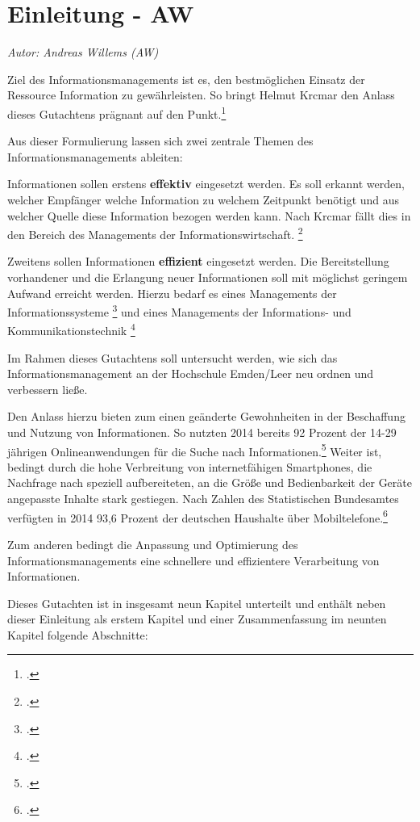 \chapter{Einleitung - AW}
\textit{Autor: Andreas Willems (AW)}

\glqq Ziel des Informationsmanagements ist es, den bestmöglichen Einsatz der 
Ressource Information zu gewährleisten.\grqq{} So bringt Helmut Krcmar den 
Anlass dieses Gutachtens prägnant auf den Punkt.\footcite[11]{krcmar_einfuhrung_2015}

Aus dieser Formulierung lassen sich zwei zentrale Themen des Informationsmanagements ableiten:

Informationen sollen erstens \textbf{effektiv} eingesetzt werden. Es soll erkannt werden, 
welcher Empfänger welche Information zu welchem Zeitpunkt benötigt und aus welcher 
Quelle diese Information bezogen werden kann. Nach Krcmar fällt dies in den Bereich des
\glqq Managements der Informationswirtschaft\grqq{}.
\footcite[Vgl.][13 ff.]{krcmar_einfuhrung_2015}

Zweitens sollen Informationen \textbf{effizient} eingesetzt werden. Die Bereitstellung vorhandener und die Erlangung neuer Informationen soll mit möglichst geringem Aufwand
erreicht werden. Hierzu bedarf es eines \glqq Managements der Informationssysteme\grqq{}
\footcite[Vgl.][41 ff.]{krcmar_einfuhrung_2015}
und eines \glqq Managements der Informations- und Kommunikationstechnik\grqq{}
\footcite[Vgl.][89 ff.]{krcmar_einfuhrung_2015}

Im Rahmen dieses Gutachtens soll untersucht werden, wie sich das Informationsmanagement
an der Hochschule Emden/Leer neu ordnen und verbessern ließe.

Den Anlass hierzu bieten zum einen geänderte Gewohnheiten in der Beschaffung und 
Nutzung von Informationen. So nutzten 2014 bereits 92 Prozent der 14-29 jährigen Onlineanwendungen
für die Suche nach Informationen.\footcite{ardzdf_studie_2014}
Weiter ist, bedingt durch die hohe Verbreitung von internetfähigen Smartphones, die Nachfrage nach speziell 
aufbereiteten, an die Größe und Bedienbarkeit der Geräte angepasste Inhalte stark gestiegen. Nach Zahlen des 
Statistischen Bundesamtes verfügten in 2014 93,6 Prozent der deutschen Haushalte über 
Mobiltelefone.\footcite{statistisches_bundesamt_2015}

Zum anderen bedingt die Anpassung und Optimierung des Informationsmanagements eine schnellere und 
effizientere Verarbeitung von Informationen.

Dieses Gutachten ist in insgesamt neun Kapitel unterteilt und enthält neben dieser Einleitung als erstem Kapitel und einer Zusammenfassung im neunten Kapitel folgende Abschnitte:

